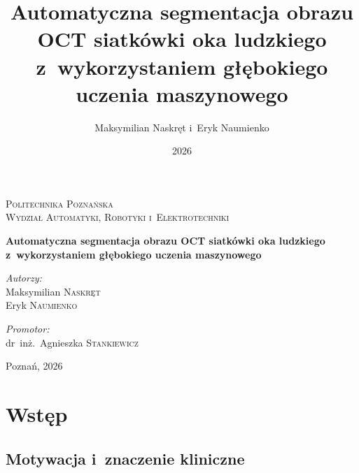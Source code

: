 \documentclass[12pt,a4paper,oneside]{report}
\title{Automatyczna segmentacja obrazu OCT siatkówki oka ludzkiego z~wykorzystaniem głębokiego uczenia maszynowego}
\author{Maksymilian Naskręt i~Eryk Naumienko}
\date{2026}
\begin{document}
\begin{titlepage}
 \begin{center}
 \vspace*{1cm}
 
 \textsc{\Large Politechnika Poznańska}\\[0.5cm]
 \textsc{\large Wydział Automatyki, Robotyki i~Elektrotechniki}\\[1.5cm]

 \vspace{1.5cm}

 {\huge \bfseries Automatyczna segmentacja obrazu OCT siatkówki oka ludzkiego z~wykorzystaniem głębokiego uczenia maszynowego}\\[2cm]

 \begin{minipage}{0.4\textwidth}
 \begin{flushleft} \large
 \emph{Autorzy:}\\
 Maksymilian \textsc{Naskręt}\\
 Eryk \textsc{Naumienko}
 \end{flushleft}
 \end{minipage}
 \begin{minipage}{0.4\textwidth}
 \begin{flushright} \large
 \emph{Promotor:} \\
 dr~inż.~Agnieszka \textsc{Stankiewicz}
 \end{flushright}
 \end{minipage}

 \vfill

 {\large Poznań, 2026}
 \end{center}
\end{titlepage}

\tableofcontents
\listoffigures
\listoftables

\chapter{Wstęp}

\section{Motywacja i~znaczenie kliniczne}
\end{document}
